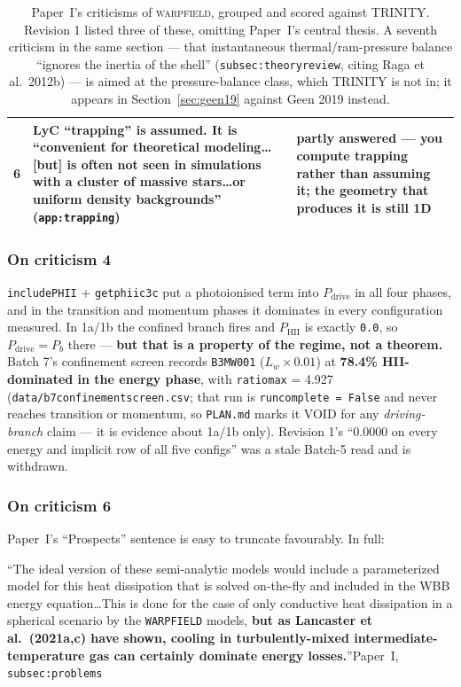 \documentclass[11pt,a4paper,oneside]{report}
\newcommand{\brkus}{\textunderscore\allowbreak}
\newcommand{\code}[1]{\texttt{\small\let\_\brkus #1}}
\newcommand{\lbl}[1]{\texttt{\footnotesize\let\_\brkus #1}}
\newcommand{\PI}{Paper~I}
\newcommand{\Pb}{P_{b}}
\newcommand{\PHII}{P_{\mathrm{HII}}}
\newcommand{\Pdrive}{P_{\mathrm{drive}}}
\newcommand{\up}[1]{\textcolor{tqaccent}{\textbf{#1}}}
\begin{document}
\begin{table}[htbp]
\begin{tabular}{@{}c>{\raggedright\arraybackslash}p{}
                  >{\raggedright\arraybackslash}p{}@{}}
6 & \textbf{LyC ``trapping'' is assumed.} It is ``convenient for theoretical modeling\ldots [but]
    is often not seen in simulations with a cluster of massive stars\ldots or uniform density
    backgrounds'' (\lbl{app:trapping}) & partly answered --- you compute trapping rather than
    assuming it; the geometry that produces it is still 1D\\
\bottomrule
\end{tabular}
\caption{\PI's criticisms of \textsc{warpfield}, grouped and scored against TRINITY. Revision 1
listed three of these, omitting \PI's central thesis. A seventh criticism in the same section ---
that instantaneous thermal/ram-pressure balance ``ignores the inertia of the shell''
(\lbl{subsec:theory\_review}, citing Raga et al.\ 2012b) --- is aimed at the pressure-balance class,
which TRINITY is not in; it appears in Section~\ref{sec:geen19} against Geen 2019 instead.}
\end{table}

\subsubsection*{On criticism 4}
\code{include\_PHII} + \code{get\_phii\_c3c} put a photoionised term into $\Pdrive$ in all
four phases, and in the transition and momentum phases it dominates in every configuration
measured. In 1a/1b the confined branch fires and $\PHII$ is exactly \code{0.0}, so
$\Pdrive=\Pb$ there --- \up{but that is a property of the regime, not a theorem.} Batch 7's
confinement screen records \code{B3MW001} ($L_w\times0.01$) at \up{78.4\% HII-dominated in
the energy phase}, with \code{ratio\_max} = 4.927 (\code{data/b7\_confinement\_screen.csv}; that run
is \code{run\_complete = False} and never reaches transition or momentum, so \code{PLAN.md} marks it
VOID for any \emph{driving-branch} claim --- it is evidence about 1a/1b only). Revision 1's ``0.0000 on every energy and implicit row of all five configs''
was a stale Batch-5 read and is withdrawn.

\subsubsection*{On criticism 6}
\PI's ``Prospects'' sentence is easy to truncate favourably. In full:

\begin{litquote}
\small ``The ideal version of these semi-analytic models would include a parameterized model
for this heat dissipation that is solved on-the-fly and included in the WBB energy
equation\ldots This is done for the case of only conductive heat dissipation in a spherical
scenario by the \texttt{WARPFIELD} models, \textbf{but as Lancaster et al.\ (2021a,c) have shown, cooling in
turbulently-mixed intermediate-temperature gas can certainly dominate energy losses.}''\hfill{\scriptsize\PI, \lbl{subsec:problems}}
\end{litquote}
\end{document}
